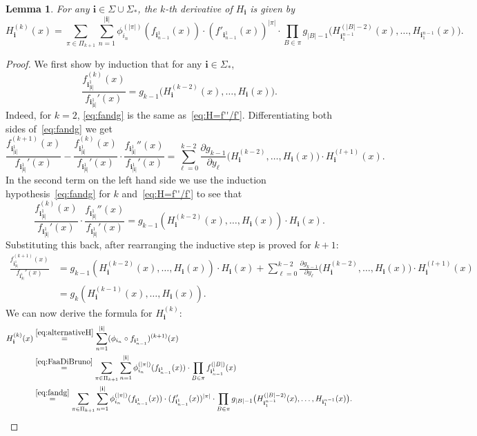 \documentclass[11pt,]{article}
\def\cref#1{\ref{#1}}%
\newtheorem{lemma}[theorem]{Lemma}
\theoremstyle{definition}
\theoremstyle{remark}
\newcommand{\0}{\mathbf{0}}
\newcommand{\bi}{\mathbf{i}}
\begin{document}
\begin{lemma}
\label{thm:ugly}
For any $\bi\in\Sigma\cup\Sigma_*$, the $k$-th derivative of $H_{\bi}$ is given by
\[
H_{\bi}^{(k)}(x)
=\sum_{\pi\in\Pi_{k+1}} \sum_{n=1}^{|\bi|} \phi_{i_n}^{(|\pi|)}(f_{\bi_{n-1}^1}(x))\cdot
(f'_{\bi_{n-1}^1}(x))^{|\pi|}\cdot \prod_{B\in\pi}
g_{|B|-1}\big(H_{\bi_1^{n-1}}^{(|B|-2)}(x),\dots,H_{\bi_1^{n-1}}(x)\big).
\]
\end{lemma}
\begin{proof}
We first show by induction that for any $\bi\in\Sigma_*$,
\begin{equation}
	\label{eq:fandg}
	\frac{f_{\bi_{|\bi|}^1}^{(k)}(x)}{f_{\bi_{|\bi|}^1}'(x)}
	=
	g_{k-1}\big(H_{\bi}^{(k-2)}(x), \dots, H_{\bi}(x)\big).
\end{equation}
Indeed, for $k=2$, \cref{eq:fandg} is the same as~\cref{eq:H=f''/f'}. Differentiating both sides
of~\cref{eq:fandg} we get
\[
\frac{f_{\bi_{|\bi|}^1}^{(k+1)}(x)}{f_{\bi_{|\bi|}^1}'(x)} -
\frac{f_{\bi_{|\bi|}^1}^{(k)}(x)}{f_{\bi_{|\bi|}^1}'(x)}\cdot
\frac{f_{\bi_{|\bi|}^1}''(x)}{f_{\bi_{|\bi|}^1}'(x)}
=\sum_{\ell=0}^{k-2}\frac{\partial g_{k-1}}{\partial
y_{\ell}}\big(H_{\bi}^{(k-2)},\dots,H_{\bi}(x)\big) \cdot H_{\bi}^{(l+1)}(x).
\]
In the second term on the left hand side we use the induction hypothesis~\cref{eq:fandg} for $k$
and~\cref{eq:H=f''/f'} to see that
\[
\frac{f_{\bi_{|\bi|}^1}^{(k)}(x)}{f_{\bi_{|\bi|}^1}'(x)}\cdot
\frac{f_{\bi_{|\bi|}^1}''(x)}{f_{\bi_{|\bi|}^1}'(x)}
=g_{k-1}(H_{\bi}^{(k-2)}(x),\dots, H_{\bi}(x)) \cdot H_{\bi}(x).
\]
Substituting this back, after rearranging the inductive step is proved for $k+1$: 
\begin{align*}
\frac{f_{\bi_{|\bi|}^1}^{(k+1)}(x)}{f_{\bi_{|\bi|}^1}'(x)}
&=
g_{k-1}(H_{\bi}^{(k-2)}(x),\dots, H_{\bi}(x)) \cdot H_{\bi}(x)
+
\sum_{\ell=0}^{k-2}\frac{\partial g_{k-1}}{\partial
y_{\ell}}\big(H_{\bi}^{(k-2)},\dots,H_{\bi}(x)\big) \cdot H_{\bi}^{(l+1)}(x)
\\
&=
g_{k}(H_{\bi}^{(k-1)}(x), \dots, H_{\bi}(x)).
\end{align*}
We can now derive the formula for $H_{\bi}^{(k)}$:
\begin{align*}
H_{\bi}^{(k)}(x)
&\stackrel{\eqref{eq:alternativeH}}{=}\sum_{n=1}^{|\bi|} (\phi_{i_n}\circ f_{\bi_{n-1}^1})^{(k+1)}(x) \\
&\stackrel{\eqref{eq:FaaDiBruno}}{=}\sum_{\pi\in\Pi_{k+1}} \sum_{n=1}^{|\bi|}
\phi_{i_n}^{(|\pi|)}(f_{\bi_{n-1}^1}(x))\cdot
\prod_{B\in\pi} f_{\bi_{n-1}^1}^{(|B|)}(x) \\
&\stackrel{\eqref{eq:fandg}}{=}\sum_{\pi\in\Pi_{k+1}} \sum_{n=1}^{|\bi|}
\phi_{i_n}^{(|\pi|)}(f_{\bi_{n-1}^1}(x))\cdot
(f'_{\bi_{n-1}^1}(x))^{|\pi|} \cdot \prod_{B\in\pi}
g_{|B|-1}\big(H_{\bi_1^{n-1}}^{(|B|-2)}(x),\dots,H_{\bi_1^{n-1}}(x)\big).
\end{align*}
\end{proof}
\end{document}
